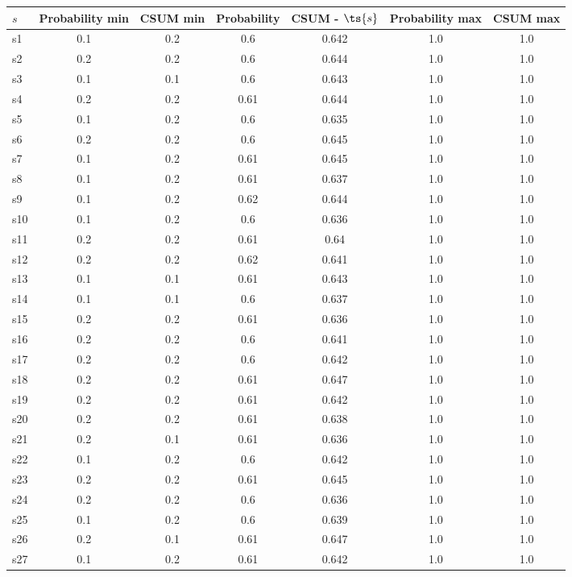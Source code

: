 \documentclass{article}
\begin{document}
\noindent\begin{tabular}{|l|c|c|c|c|c|c|}
\hline
$s$& Probability min & CSUM min & Probability & CSUM - $\ts{s}$ & Probability max & CSUM max\\
\hline
s1 &0.1 & 0.2 & 0.6 & 0.642 & 1.0 & 1.0\\
\hline
s2 &0.2 & 0.2 & 0.6 & 0.644 & 1.0 & 1.0\\
\hline
s3 &0.1 & 0.1 & 0.6 & 0.643 & 1.0 & 1.0\\
\hline
s4 &0.2 & 0.2 & 0.61 & 0.644 & 1.0 & 1.0\\
\hline
s5 &0.1 & 0.2 & 0.6 & 0.635 & 1.0 & 1.0\\
\hline
s6 &0.2 & 0.2 & 0.6 & 0.645 & 1.0 & 1.0\\
\hline
s7 &0.1 & 0.2 & 0.61 & 0.645 & 1.0 & 1.0\\
\hline
s8 &0.1 & 0.2 & 0.61 & 0.637 & 1.0 & 1.0\\
\hline
s9 &0.1 & 0.2 & 0.62 & 0.644 & 1.0 & 1.0\\
\hline
s10 &0.1 & 0.2 & 0.6 & 0.636 & 1.0 & 1.0\\
\hline
s11 &0.2 & 0.2 & 0.61 & 0.64 & 1.0 & 1.0\\
\hline
s12 &0.2 & 0.2 & 0.62 & 0.641 & 1.0 & 1.0\\
\hline
s13 &0.1 & 0.1 & 0.61 & 0.643 & 1.0 & 1.0\\
\hline
s14 &0.1 & 0.1 & 0.6 & 0.637 & 1.0 & 1.0\\
\hline
s15 &0.2 & 0.2 & 0.61 & 0.636 & 1.0 & 1.0\\
\hline
s16 &0.2 & 0.2 & 0.6 & 0.641 & 1.0 & 1.0\\
\hline
s17 &0.2 & 0.2 & 0.6 & 0.642 & 1.0 & 1.0\\
\hline
s18 &0.2 & 0.2 & 0.61 & 0.647 & 1.0 & 1.0\\
\hline
s19 &0.2 & 0.2 & 0.61 & 0.642 & 1.0 & 1.0\\
\hline
s20 &0.2 & 0.2 & 0.61 & 0.638 & 1.0 & 1.0\\
\hline
s21 &0.2 & 0.1 & 0.61 & 0.636 & 1.0 & 1.0\\
\hline
s22 &0.1 & 0.2 & 0.6 & 0.642 & 1.0 & 1.0\\
\hline
s23 &0.2 & 0.2 & 0.61 & 0.645 & 1.0 & 1.0\\
\hline
s24 &0.2 & 0.2 & 0.6 & 0.636 & 1.0 & 1.0\\
\hline
s25 &0.1 & 0.2 & 0.6 & 0.639 & 1.0 & 1.0\\
\hline
s26 &0.2 & 0.1 & 0.61 & 0.647 & 1.0 & 1.0\\
\hline
s27 &0.1 & 0.2 & 0.61 & 0.642 & 1.0 & 1.0\\

\end{tabular}
\end{document}
